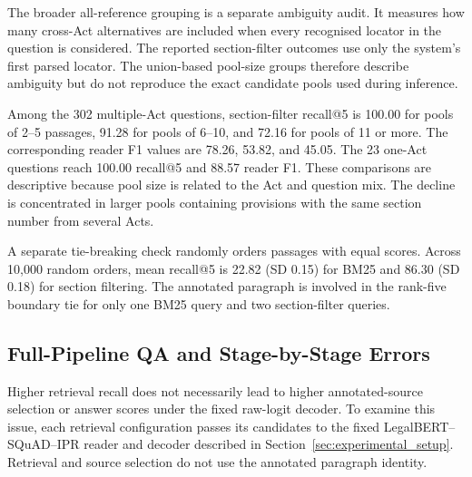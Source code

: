 \documentclass[pdflatex,sn-basic]{sn-jnl}%
\theoremstyle{thmstyleone}%
\theoremstyle{thmstyletwo}%
\theoremstyle{thmstylethree}%
\newcommand{\fixedreader}{LegalBERT--SQuAD--IPR}
\begin{document}
The broader all-reference grouping is a separate ambiguity audit. It measures
how many cross-Act alternatives are included when every recognised locator
in the question is considered. The reported section-filter outcomes use only
the system's first parsed locator. The union-based pool-size groups therefore
describe ambiguity but do not reproduce the exact candidate pools used during
inference.

Among the 302 multiple-Act questions, section-filter recall@5 is 100.00 for
pools of 2--5 passages, 91.28 for pools of 6--10, and 72.16 for pools of 11
or more. The corresponding reader F1 values are 78.26, 53.82, and 45.05.
The 23 one-Act questions reach 100.00 recall@5 and 88.57 reader F1. These
comparisons are descriptive because pool size is related to the Act and
question mix. The decline is concentrated in larger pools containing
provisions with the same section number from several Acts.

A separate tie-breaking check randomly orders passages with equal scores.
Across 10,000 random orders, mean recall@5 is 22.82 (SD 0.15) for BM25 and
86.30 (SD 0.18) for section filtering. The annotated paragraph is involved
in the rank-five boundary tie for only one BM25 query and two section-filter
queries.

\subsection{Full-Pipeline QA and Stage-by-Stage Errors}
\label{sec:section_end_to_end}

Higher retrieval recall does not necessarily lead to higher annotated-source
selection or answer scores under the fixed raw-logit decoder. To examine this
issue, each retrieval configuration passes its candidates to the fixed
\fixedreader{} reader and decoder described in
Section~\ref{sec:experimental_setup}. Retrieval and source selection do not
use the annotated paragraph identity.
\end{document}
